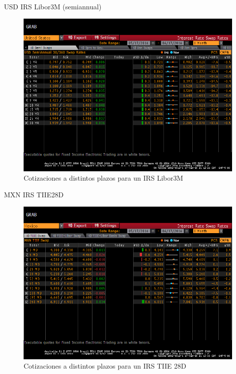 \documentclass[11pt]{beamer}
\begin{document}
\begin{frame}{USD IRS Libor3M (semiannual)}
	\begin{figure}
		\centering
		\includegraphics[width=0.7\linewidth]{USDLIBOR3MSWAP}
		\caption{Cotizaciones a distintos plazos para un IRS Libor3M}
		\label{fig:usdlibor3mswap}
	\end{figure}
	
\end{frame}

\begin{frame}{MXN IRS TIIE28D}
	\begin{figure}
		\centering
		\includegraphics[width=0.8\linewidth]{MXNTIIESWAP}
		\caption{Cotizaciones a distintos plazos para un IRS TIIE 28D}
		\label{fig:mxntiieswap}
	\end{figure}
	
\end{frame}
\end{document}
